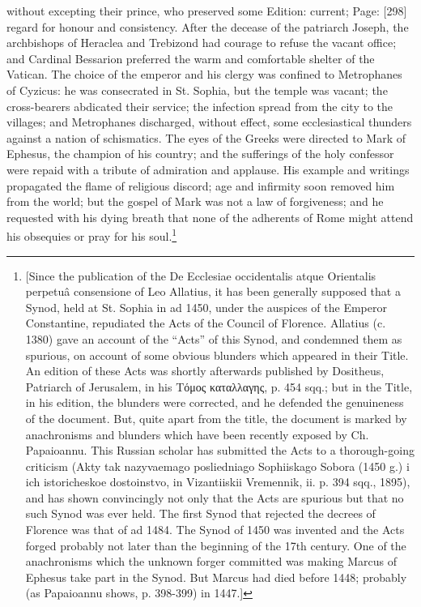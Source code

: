 without excepting their prince, who preserved some Edition: current; Page: [298] regard for honour and consistency. After the decease of the patriarch Joseph, the archbishops of Heraclea and Trebizond had courage to refuse the vacant office; and Cardinal Bessarion preferred the warm and comfortable shelter of the Vatican. The choice of the emperor and his clergy was confined to Metrophanes of Cyzicus: he was consecrated in St. Sophia, but the temple was vacant; the cross-bearers abdicated their service; the infection spread from the city to the villages; and Metrophanes discharged, without effect, some ecclesiastical thunders against a nation of schismatics. The eyes of the Greeks were directed to Mark of Ephesus, the champion of his country; and the sufferings of the holy confessor were repaid with a tribute of admiration and applause. His example and writings propagated the flame of religious discord; age and infirmity soon removed him from the world; but the gospel of Mark was not a law of forgiveness; and he requested with his dying breath that none of the adherents of Rome might attend his obsequies or pray for his soul.\footnote{[Since the publication of the De Ecclesiae occidentalis atque Orientalis perpetuâ consensione of Leo Allatius, it has been generally supposed that a Synod, held at St. Sophia in ad 1450, under the auspices of the Emperor Constantine, repudiated the Acts of the Council of Florence. Allatius (c. 1380) gave an account of the \texthebrew{“}Acts\texthebrew{}” of this Synod, and condemned them as spurious, on account of some obvious blunders which appeared in their Title. An edition of these Acts was shortly afterwards published by Dositheus, Patriarch of Jerusalem, in his \textgreek{Τόμος καταλλαγης}, p. 454 sqq.; but in the Title, in his edition, the blunders were corrected, and he defended the genuineness of the document. But, quite apart from the title, the document is marked by anachronisms and blunders which have been recently exposed by Ch. Papaioannu. This Russian scholar has submitted the Acts to a thorough-going criticism (Akty tak nazyvaemago posliedniago Sophiiskago Sobora (1450 g.) i ich istoricheskoe dostoinstvo, in Vizantiiskii Vremennik, ii. p. 394 sqq., 1895), and has shown convincingly not only that the Acts are spurious but that no such Synod was ever held. The first Synod that rejected the decrees of Florence was that of ad 1484. The Synod of 1450 was invented and the Acts forged probably not later than the beginning of the 17th century. One of the anachronisms which the unknown forger committed was making Marcus of Ephesus take part in the Synod. But Marcus had died before 1448; probably (as Papaioannu shows, p. 398-399) in 1447.]}

